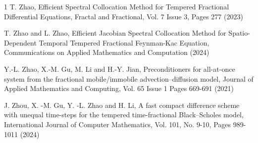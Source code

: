 \documentclass[10pt, reqno]{amsart}
\theoremstyle{remark}
\theoremstyle{definition}
\numberwithin{table}{section}
\begin{document}
\begin{thebibliography}{1}
T.  Zhao,  Efficient Spectral Collocation Method for Tempered Fractional Differential Equations,  Fractal and Fractional,  Vol.  7 Issue 3,  Pages 277 (2023)

T.  Zhao and L.  Zhao,  Efficient Jacobian Spectral Collocation Method for Spatio-Dependent Temporal Tempered Fractional Feynman-Kac Equation,  Communications on Applied Mathematics and Computation (2024)

Y.-L. Zhao, X.-M. Gu, M. Li and H.-Y. Jian, Preconditioners for all-at-once system from the fractional mobile/immobile advection–diffusion model, Journal of Applied Mathematics and Computing, Vol. 65 Issue 1 Pages 669-691 (2021)

J.  Zhou,  X. -M.  Gu,  Y. -L.  Zhao and H.  Li,  A fast compact difference scheme with unequal time-steps for the tempered time-fractional Black–Scholes model,  International Journal of Computer Mathematics,  Vol.  101,  No.  9-10,  Pages 989- 1011 (2024)

\end{thebibliography}
\end{document}
